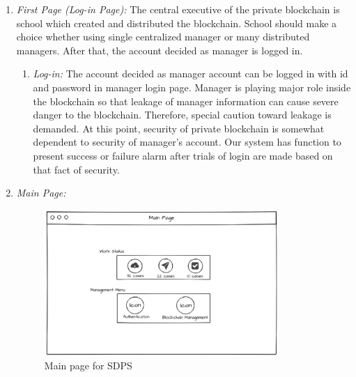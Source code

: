 \documentclass[conference]{IEEEtran}
\begin{document}
\begin{enumerate}
	\item \textit {First Page (Log-in Page): }The central executive of the private blockchain is school which created and distributed the blockchain. School should make a choice whether using single centralized manager or many distributed managers. After that, the account decided as manager is logged in.\\
    \begin{enumerate}
    	\item \textit{Log-in:} The account decided as manager account can be logged in with id and password in manager login page. Manager is playing major role inside the blockchain so that leakage of manager information can cause severe danger to the blockchain. Therefore, special caution toward leakage is demanded. At this point, security of private blockchain is somewhat dependent to security of manager’s account. Our system has function to present success or failure alarm after trials of login are made based on that fact of security. \\
    \end{enumerate}
    
    \item \textit {Main Page: }
    \begin{figure}[htbp]
	\centerline{\includegraphics[width=89mm,scale=0.5]{school/mainPage.png}}
	\caption{Main page for SDPS}
	\label{fig}
	\end{figure} 
    

\end{enumerate}
\end{document}
